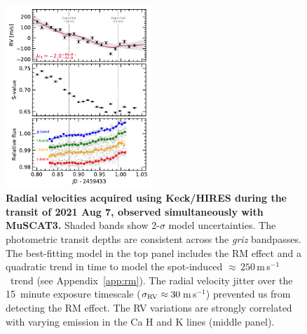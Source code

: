\documentclass[12pt,modern,twocolumn,tighten]{aastex63}
\newcommand{\ms}{\,m\,s$^{-1}$}
\begin{document}
\begin{figure}[t]
	\begin{center}
		\leavevmode
		\includegraphics[width=0.49\textwidth]{f7.pdf}
	\end{center}
	\vspace{-0.7cm}
	\caption{
    {\bf Radial velocities acquired using Keck/HIRES during the
    transit of 2021 Aug 7, observed simultaneously with MuSCAT3.}
    Shaded bands show 2-$\sigma$ model uncertainties.  The photometric
    transit depths are consistent across the {\it griz} bandpasses.
    The best-fitting model in the top panel includes the RM effect and
    a quadratic trend in time to model the spot-induced
    $\approx$\,$250$\ms\ trend (see Appendix~\ref{app:rm}).  The
    radial velocity jitter over the 15~minute exposure timescale
    ($\sigma_{\rm RV}\approx30$\ms) prevented us from detecting the RM
    effect.  The RV variations are strongly correlated with varying
    emission in the Ca H and K lines (middle panel).
		\label{fig:ground}
	}
\end{figure}
\end{document}
